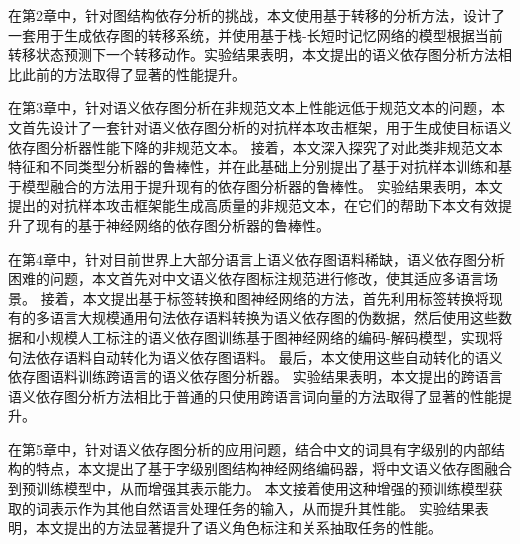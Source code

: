 在第2章中，针对图结构依存分析的挑战，本文使用基于转移的分析方法，设计了一套用于生成依存图的转移系统，并使用基于栈-长短时记忆网络的模型根据当前转移状态预测下一个转移动作。实验结果表明，本文提出的语义依存图分析方法相比此前的方法取得了显著的性能提升。

在第3章中，针对语义依存图分析在非规范文本上性能远低于规范文本的问题，本文首先设计了一套针对语义依存图分析的对抗样本攻击框架，用于生成使目标语义依存图分析器性能下降的非规范文本。
接着，本文深入探究了对此类非规范文本特征和不同类型分析器的鲁棒性，并在此基础上分别提出了基于对抗样本训练和基于模型融合的方法用于提升现有的依存图分析器的鲁棒性。
实验结果表明，本文提出的对抗样本攻击框架能生成高质量的非规范文本，在它们的帮助下本文有效提升了现有的基于神经网络的依存图分析器的鲁棒性。

在第4章中，针对目前世界上大部分语言上语义依存图语料稀缺，语义依存图分析困难的问题，本文首先对中文语义依存图标注规范进行修改，使其适应多语言场景。
接着，本文提出基于标签转换和图神经网络的方法，首先利用标签转换将现有的多语言大规模通用句法依存语料转换为语义依存图的伪数据，然后使用这些数据和小规模人工标注的语义依存图训练基于图神经网络的编码-解码模型，实现将句法依存语料自动转化为语义依存图语料。
最后，本文使用这些自动转化的语义依存图语料训练跨语言的语义依存图分析器。
实验结果表明，本文提出的跨语言语义依存图分析方法相比于普通的只使用跨语言词向量的方法取得了显著的性能提升。

在第5章中，针对语义依存图分析的应用问题，结合中文的词具有字级别的内部结构的特点，本文提出了基于字级别图结构神经网络编码器，将中文语义依存图融合到预训练模型中，从而增强其表示能力。
本文接着使用这种增强的预训练模型获取的词表示作为其他自然语言处理任务的输入，从而提升其性能。
实验结果表明，本文提出的方法显著提升了语义角色标注和关系抽取任务的性能。

